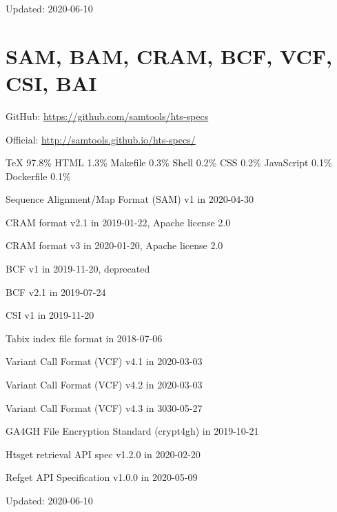 \documentclass[]{article}
\begin{document}
Updated: 2020-06-10


\section{SAM, BAM, CRAM, BCF, VCF, CSI, BAI}

GitHub: \url{https://github.com/samtools/hts-specs}

Official: \url{http://samtools.github.io/hts-specs/}

TeX 97.8\% HTML 1.3\% Makefile 0.3\% Shell 0.2\% CSS 0.2\% JavaScript 0.1\% Dockerfile 0.1\% 

Sequence Alignment/Map Format (SAM) v1 in 2020-04-30

CRAM format v2.1 in 2019-01-22, Apache license 2.0

CRAM format v3 in 2020-01-20, Apache license 2.0

BCF v1 in 2019-11-20, deprecated

BCF v2.1 in 2019-07-24

CSI v1 in 2019-11-20

Tabix index file format in 2018-07-06

Variant Call Format (VCF) v4.1 in 2020-03-03

Variant Call Format (VCF) v4.2 in 2020-03-03

Variant Call Format (VCF) v4.3 in 3030-05-27

GA4GH File Encryption Standard (crypt4gh) in 2019-10-21

Htsget retrieval API spec v1.2.0 in 2020-02-20

Refget API Specification v1.0.0 in 2020-05-09

Updated: 2020-06-10
\end{document}
